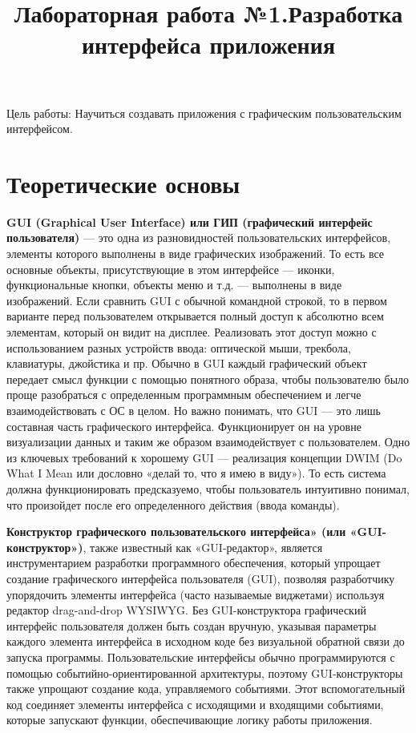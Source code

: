 \documentclass[a4paper]{article}
\begin{document}
\title{\bfseries Лабораторная работа №1.\newline Разработка интерфейса приложения}
\date{}

\maketitle

\newpage

Цель работы: Научиться создавать приложения с графическим пользовательским интерфейсом.

\section{Теоретические основы}

\textbf{GUI (Graphical User Interface) или ГИП (графический интерфейс пользователя)} --- это одна из разновидностей пользовательских интерфейсов, элементы которого выполнены в виде графических изображений. То есть все основные объекты, присутствующие в этом интерфейсе — иконки, функциональные кнопки, объекты меню и т.д. — выполнены в виде изображений. Если сравнить GUI с обычной командной строкой, то в первом варианте перед пользователем открывается полный доступ к абсолютно всем элементам, который он видит на дисплее. Реализовать этот доступ можно с использованием разных устройств ввода: оптической мыши, трекбола, клавиатуры, джойстика и пр. Обычно в GUI каждый графический объект передает смысл функции с помощью понятного образа, чтобы пользователю было проще разобраться с определенным программным обеспечением и легче взаимодействовать с ОС в целом. Но важно понимать, что GUI — это лишь составная часть графического интерфейса. Функционирует он на уровне визуализации данных и таким же образом взаимодействует с пользователем. Одно из ключевых требований к хорошему GUI — реализация концепции DWIM (Do What I Mean или дословно «делай то, что я имею в виду»). То есть система должна функционировать предсказуемо, чтобы пользователь интуитивно понимал, что произойдет после его определенного действия (ввода команды).

\textbf{Конструктор графического пользовательского интерфейса» (или «GUI-конструктор»)}, также известный как «GUI-редактор», является инструментарием разработки программного обеспечения, который упрощает создание графического интерфейса пользователя (GUI), позволяя разработчику упорядочить элементы интерфейса (часто называемые виджетами) используя редактор drag-and-drop WYSIWYG. Без GUI-конструктора графический интерфейс пользователя должен быть создан вручную, указывая параметры каждого элемента интерфейса в исходном коде без визуальной обратной связи до запуска программы. Пользовательские интерфейсы обычно программируются с помощью событийно-ориентированной архитектуры, поэтому GUI-конструкторы также упрощают создание кода, управляемого событиями. Этот вспомогательный код соединяет элементы интерфейса с исходящими и входящими событиями, которые запускают функции, обеспечивающие логику работы приложения.
\end{document}
